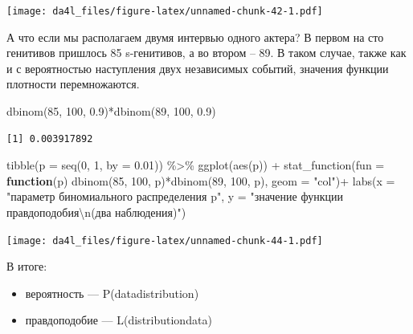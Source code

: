 \documentclass[
]{book}
\newenvironment{Shaded}{\begin{snugshade}}{\end{snugshade}}
\newcommand{\AttributeTok}[1]{\textcolor[rgb]{0.77,0.63,0.00}{#1}}
\newcommand{\ControlFlowTok}[1]{\textcolor[rgb]{0.13,0.29,0.53}{\textbf{#1}}}
\newcommand{\DecValTok}[1]{\textcolor[rgb]{0.00,0.00,0.81}{#1}}
\newcommand{\FloatTok}[1]{\textcolor[rgb]{0.00,0.00,0.81}{#1}}
\newcommand{\FunctionTok}[1]{\textcolor[rgb]{0.00,0.00,0.00}{#1}}
\newcommand{\NormalTok}[1]{#1}
\newcommand{\SpecialCharTok}[1]{\textcolor[rgb]{0.00,0.00,0.00}{#1}}
\newcommand{\StringTok}[1]{\textcolor[rgb]{0.31,0.60,0.02}{#1}}
\providecommand{\tightlist}{%
  \setlength{\itemsep}{0pt}\setlength{\parskip}{0pt}}
\begin{document}
\texttt{[image: da4l\_files/figure-latex/unnamed-chunk-42-1.pdf]}

А что если мы располагаем двумя интервью одного актера? В первом на сто генитивов пришлось 85 s-генитивов, а во втором -- 89. В таком случае, также как и с вероятностью наступления двух независимых событий, значения функции плотности перемножаются.

\begin{Shaded}
\begin{Highlighting}[]
\FunctionTok{dbinom}\NormalTok{(}\DecValTok{85}\NormalTok{, }\DecValTok{100}\NormalTok{, }\FloatTok{0.9}\NormalTok{)}\SpecialCharTok{*}\FunctionTok{dbinom}\NormalTok{(}\DecValTok{89}\NormalTok{, }\DecValTok{100}\NormalTok{, }\FloatTok{0.9}\NormalTok{)}
\end{Highlighting}
\end{Shaded}

\begin{verbatim}
[1] 0.003917892
\end{verbatim}

\begin{Shaded}
\begin{Highlighting}[]
\FunctionTok{tibble}\NormalTok{(}\AttributeTok{p =} \FunctionTok{seq}\NormalTok{(}\DecValTok{0}\NormalTok{, }\DecValTok{1}\NormalTok{, }\AttributeTok{by =} \FloatTok{0.01}\NormalTok{)) }\SpecialCharTok{\%\textgreater{}\%} 
  \FunctionTok{ggplot}\NormalTok{(}\FunctionTok{aes}\NormalTok{(p)) }\SpecialCharTok{+}
  \FunctionTok{stat\_function}\NormalTok{(}\AttributeTok{fun =} \ControlFlowTok{function}\NormalTok{(p) }\FunctionTok{dbinom}\NormalTok{(}\DecValTok{85}\NormalTok{, }\DecValTok{100}\NormalTok{, p)}\SpecialCharTok{*}\FunctionTok{dbinom}\NormalTok{(}\DecValTok{89}\NormalTok{, }\DecValTok{100}\NormalTok{, p), }\AttributeTok{geom =} \StringTok{"col"}\NormalTok{)}\SpecialCharTok{+}
  \FunctionTok{labs}\NormalTok{(}\AttributeTok{x =} \StringTok{"параметр биномиального распределения p"}\NormalTok{,}
       \AttributeTok{y =} \StringTok{"значение функции правдоподобия}\SpecialCharTok{\textbackslash{}n}\StringTok{(два наблюдения)"}\NormalTok{)}
\end{Highlighting}
\end{Shaded}

\texttt{[image: da4l\_files/figure-latex/unnamed-chunk-44-1.pdf]}

В итоге:

\begin{itemize}
\tightlist
\item
  вероятность --- P(data\textbar distribution)
\item
  правдоподобие --- L(distribution\textbar data)
\end{itemize}
\end{document}
